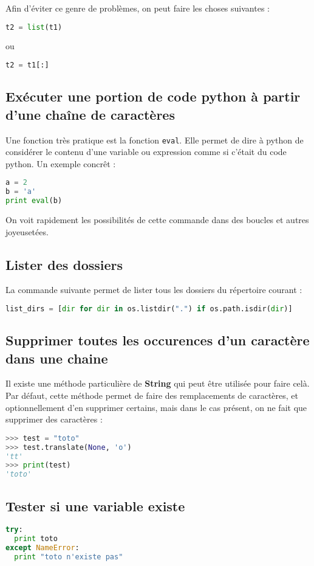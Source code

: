 \documentclass[a4paper,twoside]{article}
\begin{document}
Afin d'éviter ce genre de problèmes, on peut faire les choses suivantes :
\begin{lstlisting}[language=python]
t2 = list(t1)
\end{lstlisting}
ou
\begin{lstlisting}[language=python]
t2 = t1[:]
\end{lstlisting}

\subsection{Exécuter une portion de code python à partir d'une chaîne de caractères}
Une fonction très pratique est la fonction \texttt{eval}. Elle permet de dire à python de considérer le contenu d'une variable ou expression comme si c'était du code python. Un exemple concrêt :
\begin{lstlisting}[language=python]
a = 2
b = 'a'
print eval(b)
\end{lstlisting}

On voit rapidement les possibilités de cette commande dans des boucles et autres joyeusetées.

\subsection{Lister des dossiers}
La commande suivante permet de lister tous les dossiers du répertoire courant :
\begin{lstlisting}[language=python]
list_dirs = [dir for dir in os.listdir(".") if os.path.isdir(dir)]
\end{lstlisting}

\subsection{Supprimer toutes les occurences d'un caractère dans une chaine}
Il existe une méthode particulière de \textbf{String} qui peut être utilisée pour faire celà. Par défaut, cette méthode permet de faire des remplacements de caractères, et optionnellement d'en supprimer certains, mais dans le cas présent, on ne fait que supprimer des caractères : 
\begin{lstlisting}[language=python]
>>> test = "toto"
>>> test.translate(None, 'o')
'tt'
>>> print(test)
'toto'
\end{lstlisting}

\subsection{Tester si une variable existe}
\begin{lstlisting}[language=python]
try:
  print toto
except NameError:
  print "toto n'existe pas"
\end{lstlisting}
\end{document}
